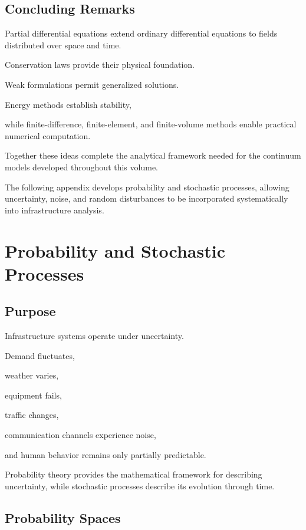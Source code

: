 \documentclass[11pt,fleqn]{book}
\numberwithin{equation}{chapter}
\theoremstyle{plain}
\theoremstyle{definition}
\theoremstyle{remark}
\begin{document}
\section{Concluding Remarks}

Partial differential equations extend ordinary differential equations to
fields distributed over space and time.

Conservation laws provide their physical foundation.

Weak formulations permit generalized solutions.

Energy methods establish stability,

while finite-difference,
finite-element,
and finite-volume methods enable practical numerical computation.

Together these ideas complete the analytical framework needed for the
continuum models developed throughout this volume.

The following appendix develops probability and stochastic processes,
allowing uncertainty, noise, and random disturbances to be incorporated
systematically into infrastructure analysis.

\chapter{Probability and Stochastic Processes}

\section{Purpose}

Infrastructure systems operate under uncertainty.

Demand fluctuates,

weather varies,

equipment fails,

traffic changes,

communication channels experience noise,

and human behavior remains only partially predictable.

Probability theory provides the mathematical framework for describing
uncertainty, while stochastic processes describe its evolution through
time.


\section{Probability Spaces}
\end{document}
